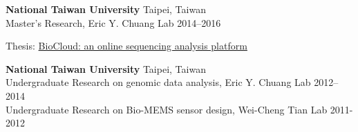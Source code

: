 \begin{outerlist}
	\item \textbf{National Taiwan University} \hfill Taipei, Taiwan\\
	Master's Research, Eric Y. Chuang Lab \hfill
	2014--2016
	\begin{innerlist}
		\item Thesis: \href{https://doi.org/10.6342/NTU201601295}{BioCloud: an online sequencing analysis platform}
	\end{innerlist}

	\item \textbf{National Taiwan University} \hfill Taipei, Taiwan\\
	Undergraduate Research on genomic data analysis, Eric Y. Chuang Lab \hfill
	2012--2014\\
	Undergraduate Research on Bio-MEMS sensor design, Wei-Cheng Tian Lab \hfill
	2011-2012

\end{outerlist}
